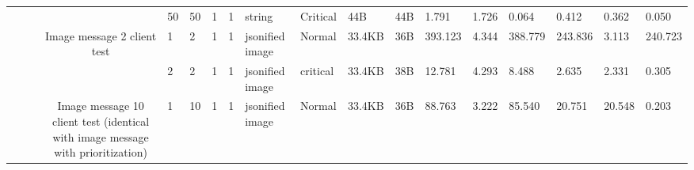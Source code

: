 \begin{landscape}
\begin{table}[]
{\begin{tabular}{@{}ccccllllllllllllll@{}}
                                                                                   &                              &                                &                                                                                                          & 50                                                    & 50                                       & 1                                          & 1                                 & string                           & Critical                           & 44B                                           & 44B                                             & 1.791                   & 1.726    & 0.064                        & 0.412                   & 0.362    & 0.050                        \\
                                                                                   &                              &                                & \multirow{2}{*}{Image message 2 client test}                                                             & 1                                                     & 2                                        & 1                                          & 1                                 & jsonified image                  & Normal                             & 33.4KB                                        & 36B                                             & 393.123                 & 4.344    & 388.779                      & 243.836                 & 3.113    & 240.723                      \\
                                                                                   &                              &                                &                                                                                                          & 2                                                     & 2                                        & 1                                          & 1                                 & jsonified image                  & critical                           & 33.4KB                                        & 38B                                             & 12.781                  & 4.293    & 8.488                        & 2.635                   & 2.331    & 0.305                        \\
                                                                                   &                              &                                & \multirow{10}{*}{Image message 10 client test (identical with image message with prioritization)}        & 1                                                     & 10                                       & 1                                          & 1                                 & jsonified image                  & Normal                             & 33.4KB                                        & 36B                                             & 88.763                  & 3.222    & 85.540                       & 20.751                  & 20.548   & 0.203                        \\

\end{tabular}}
\end{table}
\end{landscape}
